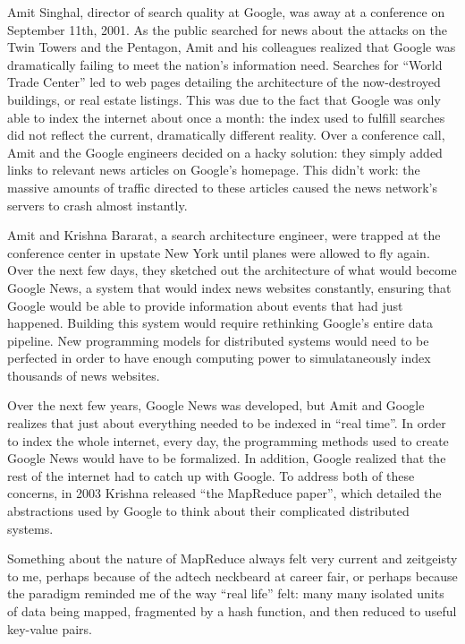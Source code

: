 \documentclass[12pt]{article}
\begin{document}
Amit Singhal, director of search quality at Google, was away at a conference on
September 11th, 2001. As the public searched for news about the attacks on the
Twin Towers and the Pentagon, Amit and his colleagues realized that Google was
dramatically failing to meet the nation's information need. Searches for ``World
Trade Center'' led to web pages detailing the architecture of the now-destroyed
buildings, or real estate listings.  This was due to the fact that Google was
only able to index the internet about once a month: the index used to fulfill
searches did not reflect the current, dramatically different reality.  Over a
conference call, Amit and the Google engineers decided on a hacky solution: they
simply added links to relevant news articles on Google's homepage.  This didn't
work: the massive amounts of traffic directed to these articles caused the news
network's servers to crash almost instantly.

Amit and Krishna Bararat, a search architecture engineer, were trapped at the
conference center in upstate New York until planes were allowed to fly again.
Over the next few days, they sketched out the architecture of what would become
Google News, a system that would index news websites constantly, ensuring that
Google would be able to provide information about events that had just happened.
Building this system would require rethinking Google's entire data pipeline.
New programming models for distributed systems would need to be perfected in
order to have enough computing power to simulataneously index thousands of news
websites.

Over the next few years, Google News was developed, but Amit and Google realizes
that just about everything needed to be indexed in ``real time''.  In order to
index the whole internet, every day, the programming methods used to create
Google News would have to be formalized.  In addition, Google realized that the
rest of the internet had to catch up with Google.  To address both of these
concerns, in 2003 Krishna released ``the MapReduce paper'', which detailed the
abstractions used by Google to think about their complicated distributed
systems.  

Something about the nature of MapReduce always felt very current and zeitgeisty
to me, perhaps because of the adtech neckbeard at career fair, or perhaps
because the paradigm reminded me of the way ``real life'' felt: many many isolated
units of data being mapped, fragmented by a hash function, and then reduced to
useful key-value pairs.
\end{document}
